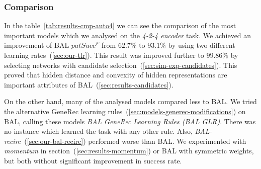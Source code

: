 
\subsubsection{Comparison} 
\label{sec:tlr-auto4-cmp} 

In the table~\ref{tab:results-cmp-auto4} we can see the comparison of the most important models which we analysed on the \emph{4-2-4 encoder} task. We achieved an improvement of BAL $patSucc^F$ from $62.7\%$ to $93.1\%$ by using two different learning rates~(\ref{sec:our-tlr}). This result was improved further to $99.86\%$ by selecting networks with candidate selection~(\ref{sec:sim-exp-candidates}). This proved that hidden distance and convexity of hidden representations are important attributes of BAL~(\ref{sec:results-candidates}). 

On the other hand, many of the analysed models compared less to BAL. We tried the alternative GeneRec learning rules~(\ref{sec:models-generec-modifications}) on BAL, calling these models \emph{BAL GeneRec Learning Rules (BAL GLR)}. There was no instance which learned the task with any other rule. Also, \emph{BAL-recirc}~(\ref{sec:our-bal-recirc}) performed worse than BAL. We experimented with \emph{momentum} in section~(\ref{sec:results-momentum}) or BAL with symmetric weights, but both without significant improvement in success rate.

